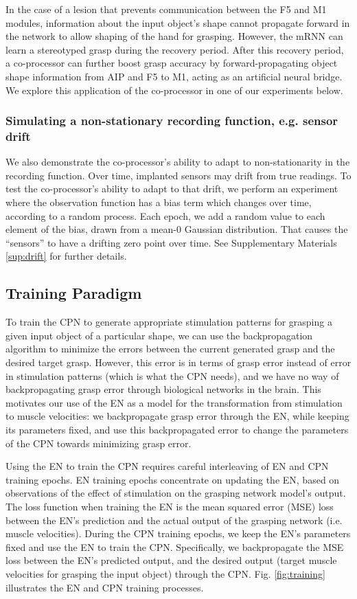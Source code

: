 \documentclass[12pt]{iopart}
\begin{document}
In the case of a lesion that prevents communication between the F5 and M1 modules, information about
the input object's shape cannot propagate forward in the network to allow shaping of the hand for
grasping. However, the mRNN can learn a stereotyped grasp during the recovery period. After this recovery
period, a co-processor can further boost grasp accuracy by forward-propagating object shape information
from AIP and F5 to M1, acting as an artificial neural bridge. We explore this application of the
co-processor in one of our experiments below.

\subsubsection{Simulating a non-stationary recording function, e.g. sensor drift}
We also demonstrate the co-processor's ability to adapt to non-stationarity in the recording
function. Over time, implanted sensors may drift from true readings. To test the co-processor's
ability to adapt to that drift, we perform an experiment where the observation function
has a bias term which changes over time, according to a random process. Each epoch, we
add a random value to each element of the bias, drawn from a mean-0 Gaussian distribution. That
causes the ``sensors'' to have a drifting zero point over time.
See Supplementary Materials \ref{sup:drift} for further details.

\subsection{Training Paradigm}
\label{sec:training}

To train the CPN to generate appropriate stimulation patterns for grasping a given input object of a
particular shape, we can use the backpropagation algorithm to minimize the errors between the current
generated grasp and the desired target grasp. However, this error is in terms of grasp error instead of
error in stimulation patterns (which is what the CPN needs), and we have no way of backpropagating grasp
error through biological networks in the brain. This motivates our use of the EN as a model for the
transformation from stimulation to muscle velocities: we backpropagate grasp error through the EN,
while keeping its parameters fixed, and use this backpropagated error to change the parameters of the
CPN towards minimizing grasp error.

Using the EN to train the CPN requires careful interleaving of EN and CPN training epochs. EN training
epochs concentrate on updating the EN, based on observations of the effect of stimulation on the grasping
network model's output. The loss function when training the EN is the mean squared error (MSE) loss between
the EN's prediction and the  actual output of the grasping network (i.e. muscle velocities). During the CPN
training epochs, we keep the EN's parameters fixed and use the EN to train the CPN. Specifically, we
backpropagate the MSE loss between the EN's predicted output, and the desired output (target muscle velocities
for grasping the input object) through the CPN. Fig. \ref{fig:training} illustrates the EN and CPN training
processes.
\end{document}
